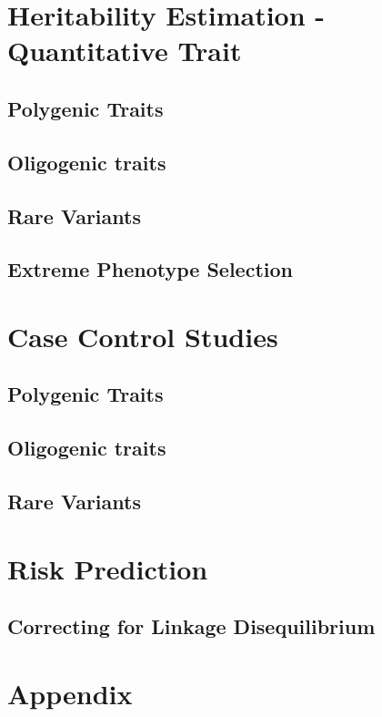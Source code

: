 \documentclass{book}
\begin{document}
\chapter{Heritability Estimation - Quantitative Trait}
\section{Polygenic Traits}
\section{Oligogenic traits}
\section{Rare Variants}
\section{Extreme Phenotype Selection}

\chapter{Case Control Studies}
\section{Polygenic Traits}
\section{Oligogenic traits}
\section{Rare Variants}

\chapter{Risk Prediction}
\section{Correcting for Linkage Disequilibrium}


\backmatter
\printbibliography
\chapter*{Appendix}
\end{document}
